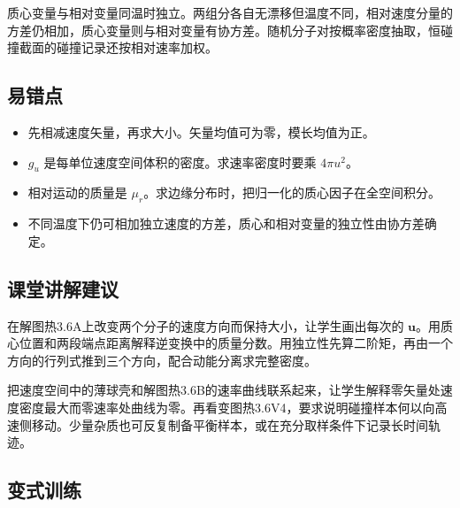 \documentclass[UTF8,fontset=fandol,a4paper,11pt]{ctexart}
\begin{document}
质心变量与相对变量同温时独立。两组分各自无漂移但温度不同，相对速度分量的方差仍相加，质心变量则与相对变量有协方差。随机分子对按概率密度抽取，恒碰撞截面的碰撞记录还按相对速率加权。



\subsection*{易错点}

\begin{itemize}
\item 先相减速度矢量，再求大小。矢量均值可为零，模长均值为正。
\item $g_u$ 是每单位速度空间体积的密度。求速率密度时要乘 $4\pi u^2$。
\item 相对运动的质量是 $\mu_r$。求边缘分布时，把归一化的质心因子在全空间积分。
\item 不同温度下仍可相加独立速度的方差，质心和相对变量的独立性由协方差确定。
\end{itemize}



\subsection*{课堂讲解建议}

在解图热3.6A上改变两个分子的速度方向而保持大小，让学生画出每次的 $\bm u$。用质心位置和两段端点距离解释逆变换中的质量分数。用独立性先算二阶矩，再由一个方向的行列式推到三个方向，配合动能分离求完整密度。

把速度空间中的薄球壳和解图热3.6B的速率曲线联系起来，让学生解释零矢量处速度密度最大而零速率处曲线为零。再看变图热3.6V4，要求说明碰撞样本何以向高速侧移动。少量杂质也可反复制备平衡样本，或在充分取样条件下记录长时间轨迹。



\subsection*{变式训练}
\end{document}
